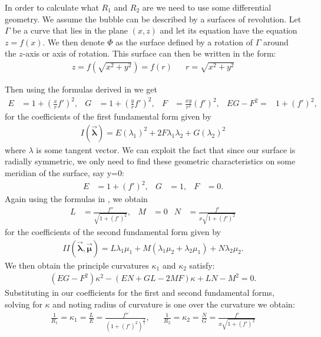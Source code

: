 In order to calculate what $R_1$ and $R_2$ are we need to use some differential geometry. We assume the bubble can be described by a surfaces of revolution.
Let $\Gamma$ be a curve that lies in the plane $(x,z)$ and let its equation have the equation $z=f(x)$. We then denote $\Phi$ as the surface defined by a rotation of $\Gamma$ around the $z$-axis or axis of rotation. This surface can then be written in the form:
\begin{align}
    z=f(\sqrt{x^2+y^2})=f(r) && r=\sqrt{x^2+y^2}
\end{align}

Then using the formulas derived in \cite{toponogov2006differential} we get
\begin{align}
    E&=1+(\frac{x}{r}f')^2,&G&=1+(\frac{y}{r}f')^2, &F&=\frac{xy}{r^2}(f')^2, &EG-F^2=&1+(f')^2,
\end{align}
for the coefficients of the first fundamental form given by
\begin{align}
    I( \vec{ \boldsymbol\lambda}) = E(\lambda_1)^2 +2F\lambda_1 \lambda_2 + G(\lambda_2)^2
\end{align}
where $\lambda$ is some tangent vector. We can exploit the fact that since our surface is radially symmetric, we only need to find these geometric characteristics on some meridian of the surface, say y=0:
\begin{align}
    E&=1+(f')^2,& G&=1, &F&=0.
\end{align}
Again using the formulas in \cite{toponogov2006differential}, we obtain
\begin{align}
    L&=\frac{f''}{\sqrt{1+(f')^2}},&M&=0&  N&=\frac{f'}{x\sqrt{1+(f')^2}}
\end{align}
for the coefficients of the second fundamental form given by
\begin{align}
    II( \vec{ \boldsymbol\lambda},\vec{ \boldsymbol\mu}) = L\lambda_1 \mu_1 +M(\lambda_1\mu_2 + \lambda_2 \mu_1)  + N\lambda_2 \mu_2.
\end{align}
We then obtain the principle curvatures $\kappa_1$ and $\kappa_2$ satisfy:
\begin{align}
    (EG-F^2)\kappa^2 - (EN+GL -2MF)\kappa +LN-M^2 = 0.
\end{align}
Substituting in our coefficients for the first and second fundamental forms, solving for $\kappa$ and noting radius of curvature is one over the curvature we obtain:
\begin{align}
    \frac{1}{R_1} =\kappa_1= \frac{L}{E}=\frac{f''}{(1+(f')^2)^{\frac{3}{2}}}, && \frac{1}{R_2} = \kappa_2 = \frac{N}{G} = \frac{f'}{x \sqrt{1+(f')^2}}
\end{align}
